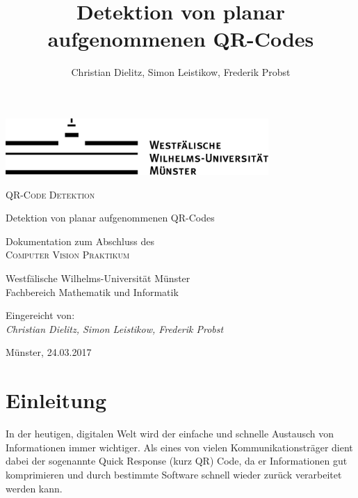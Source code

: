 \documentclass[a4paper, oneside, 12pt]{article}
\title{Detektion von planar aufgenommenen QR-Codes}
\author{Christian Dielitz, Simon Leistikow, Frederik Probst}
\begin{document}
\thispagestyle{empty}  %

\hspace*{1em}
\begin{center}
	\includegraphics[width=10cm]{images/wwu_logo}
	\par
	\vspace*{8ex}
	\Huge
	\Large\textsc{QR-Code Detektion}
	
	\vspace{10pt}
	\large Detektion von planar aufgenommenen QR-Codes
	
	\par
	\normalsize
	\vspace*{8ex}
	\normalsize
	Dokumentation zum Abschluss des\\
	\large
	\textsc{Computer Vision Praktikum}
	\par
	\normalsize
	\vspace*{12ex}
	Westfälische Wilhelms-Universität Münster\\
	Fachbereich Mathematik und Informatik\\
\end{center}
\par

\vspace*{34ex}
Eingereicht von:\\
\large
\textit{Christian Dielitz, Simon Leistikow, Frederik Probst}
\par
\normalsize
\vspace*{4ex}
Münster, 24.03.2017
\vfill
\hspace*{1em}



	
\newpage

\tableofcontents
\newpage

\section{Einleitung}
\label{s:einleitung}
In der heutigen, digitalen Welt wird der einfache und schnelle Austausch von Informationen immer wichtiger. Als eines von vielen Kommunikationsträger dient dabei der sogenannte Quick Response (kurz QR) Code, da er Informationen gut komprimieren und durch bestimmte Software schnell wieder zurück verarbeitet werden kann.
\end{document}
